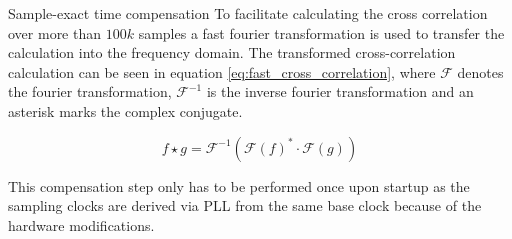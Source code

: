 \begin{subchapter}{Sample-exact time compensation}
  To facilitate calculating the cross correlation over
  more than $100k$ samples a fast fourier transformation
  is used to transfer the calculation into the frequency domain.
  The transformed cross-correlation calculation can be
  seen in equation \ref{eq:fast_cross_correlation}, where
  $\mathcal{F}$ denotes the fourier transformation,
  $\mathcal{F}^{-1}$ is the inverse fourier transformation
  and an asterisk marks the complex conjugate.

  \begin{equation}
    \label{eq:fast_cross_correlation}
    f \star g = \mathcal{F}^{-1}\left(
      \mathcal{F}\left( f \right)^{\ast}
      \cdot
      \mathcal{F}\left( g \right)
    \right)
  \end{equation}

  This compensation step only has to be performed
  once upon startup as the sampling clocks are
  derived via PLL from the same base clock because
  of the hardware modifications.
\end{subchapter}


